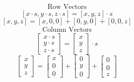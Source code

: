 \documentclass[preview]{standalone}
\begin{document}
$$\begin{align*}\text{Row Vectors}\end{align*}$$
$$\left[x\cdot s,y\cdot s,z\cdot s\right] = \left[x,y,z\right]\cdot s$$
$$\left[x, y, z\right] = \left[x,0,0\right] + \left[0,y,0\right] + \left[0,0,z\right]$$
$$\begin{align*}\text{Column Vectors}\end{align*}$$
$$\begin{bmatrix}x\cdot s\\y\cdot s\\z\cdot s\end{bmatrix} = \begin{bmatrix}x\\y\\z\end{bmatrix}\cdot s$$
$$\begin{bmatrix}x\\y\\z\end{bmatrix} = \begin{bmatrix}x\\0\\0\end{bmatrix} + \begin{bmatrix}0\\y\\0\end{bmatrix} + \begin{bmatrix}0\\0\\z\end{bmatrix}$$
\end{document}
